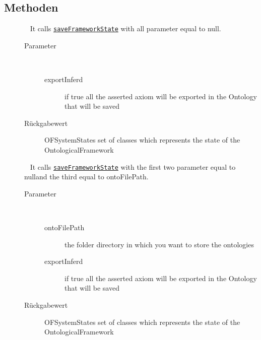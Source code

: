 \subsection{Methoden}
\begin{description}
\item[{\label{ontologyFramework.OFRunning.OFSerializator.saveFrameworkState(boolean)}}]
~ It calls \texttt{\hyperlink{ontologyFramework.OFRunning.OFSerializator.saveFrameworkState(java.util.Set<java.lang.String>,java.util.Set<java.lang.String>,java.lang.String,boolean)}{saveFrameworkState}} with all parameter equal to \textquotedbl null\textquotedbl .
\begin{description}
\item[Parameter] ~
\begin{description}
\item[exportInferd]
if true all the asserted axiom will be exported in the Ontology that will be saved
\end{description}
\item[Rückgabewert] 
OFSystemStates set of classes which represents the state of the OntologicalFramework
\end{description}
\item[{\label{ontologyFramework.OFRunning.OFSerializator.saveFrameworkState(java.lang.String,boolean)}}]
~ It calls \texttt{\hyperlink{ontologyFramework.OFRunning.OFSerializator.saveFrameworkState(java.util.Set<java.lang.String>,java.util.Set<java.lang.String>,java.lang.String,boolean)}{saveFrameworkState}} with the first two 
 parameter equal to \textquotedbl null\textquotedbl  and the third equal to ontoFilePath.
\begin{description}
\item[Parameter] ~
\begin{description}
\item[ontoFilePath]
the folder directory in which you want to store the ontologies
\item[exportInferd]
if true all the asserted axiom will be exported in the Ontology that will be saved
\end{description}
\item[Rückgabewert] 
OFSystemStates set of classes which represents the state of the OntologicalFramework

\end{description}
\end{description}
